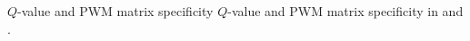 \begin{table}[t!]
\begin{center}
\begin{minipage}{0.98\linewidth}\setlength{\parindent}{0pt}
\begin{center}
\end{center}
\end{minipage}
          {$Q$-value and PWM matrix specificity}%
          {$Q$-value and PWM matrix specificity in  and .}%
          {}
\end{center}
\end{table}


